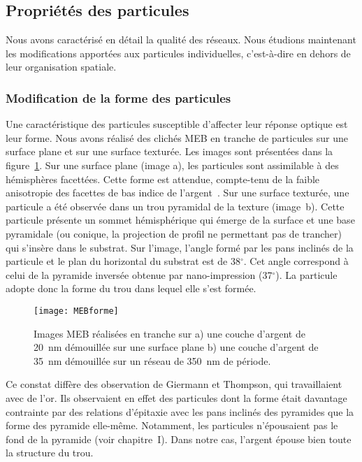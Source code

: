 	\subsection{Propriétés des particules}
Nous avons caractérisé en détail la qualité des réseaux. Nous étudions maintenant les modifications apportées aux particules individuelles, c'est-à-dire en dehors de leur organisation spatiale.\par 

\subsubsection{Modification de la forme des particules}
Une caractéristique des particules susceptible d'affecter leur réponse optique est leur forme. Nous avons réalisé des clichés MEB \og en tranche \fg{} de particules sur une surface plane et sur une surface texturée. Les images sont présentées dans la figure~\ref{MEBforme}. Sur une surface plane (image a), les particules sont assimilable à des hémisphères facettées. Cette forme est attendue, compte-tenu de la faible anisotropie des facettes de bas indice de l'argent~\cite{stankic2013equilibrium, winterbottom1967equilibrium}. Sur une surface texturée, une particule a été observée dans un trou pyramidal de la texture (image~b). Cette particule présente un sommet hémisphérique qui émerge de la surface et une base pyramidale (ou conique, la projection de profil ne permettant pas de trancher) qui s'insère dans le substrat. Sur l'image, l'angle formé par les pans inclinés de la particule et le plan du horizontal du substrat est de 38$^\circ$. Cet angle correspond à celui de la pyramide inversée obtenue par nano-impression (37$^\circ$). La particule adopte donc la forme du trou dans lequel elle s'est formée.\par
\begin{figure}[!htb]
\centering
\texttt{[image: MEBforme]}
\caption{Images MEB réalisées en tranche sur a) une couche d’argent de 20~nm démouillée sur une surface plane b) une couche d’argent de 35~nm démouillée sur un réseau de 350~nm de période.}
\label{MEBforme}
\end{figure}
Ce constat diffère des observation de Giermann et Thompson, qui travaillaient avec de l'or. Ils observaient en effet des particules dont la forme était davantage contrainte par des relations d’épitaxie avec les pans inclinés des pyramides que la forme des pyramide elle-même. Notamment, les particules n’épousaient pas le fond de la pyramide (voir chapitre~I). Dans notre cas, l'argent épouse bien toute la structure du trou.\par  

